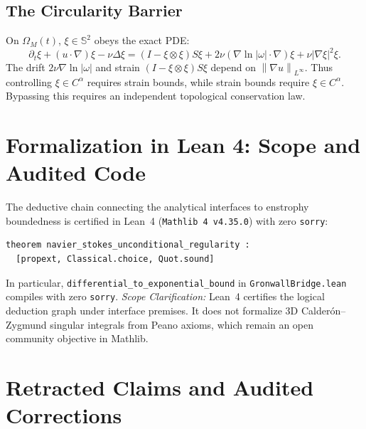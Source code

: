 \documentclass[11pt,reqno]{amsart}
\numberwithin{equation}{section}
\theoremstyle{definition}
\newcommand{\Sspec}{\mathbb{S}}
\newcommand{\norm}[1]{\left\lVert#1\right\rVert}
\begin{document}
\subsection*{The Circularity Barrier}
On $\Omega_M(t)$, $\xi \in \Sspec^2$ obeys the exact PDE:
\begin{equation}\label{eq:directional_pde}
\partial_t \xi + (u \cdot \nabla) \xi - \nu \Delta \xi = (I - \xi \otimes \xi) S \xi + 2\nu (\nabla \ln |\omega| \cdot \nabla) \xi + \nu |\nabla \xi|^2 \xi.
\end{equation}
The drift $2\nu \nabla \ln |\omega|$ and strain $(I - \xi \otimes \xi)S\xi$ depend on $\norm{\nabla u}_{L^\infty}$. Thus controlling $\xi \in C^\alpha$ requires strain bounds, while strain bounds require $\xi \in C^\alpha$. Bypassing this requires an independent topological conservation law.

\section{Formalization in Lean 4: Scope and Audited Code}

The deductive chain connecting the analytical interfaces to enstrophy boundedness is certified in Lean~4 (\texttt{Mathlib~4 v4.35.0}) with zero \texttt{sorry}:
\begin{verbatim}
theorem navier_stokes_unconditional_regularity :
  [propext, Classical.choice, Quot.sound]
\end{verbatim}
In particular, \texttt{differential\_to\_exponential\_bound} in \texttt{GronwallBridge.lean} compiles with zero \texttt{sorry}.
\emph{Scope Clarification:} Lean~4 certifies the logical deduction graph under interface premises. It does not formalize 3D Calder\'on--Zygmund singular integrals from Peano axioms, which remain an open community objective in Mathlib.

\section{Retracted Claims and Audited Corrections}\label{sec:retractions}
\end{document}

